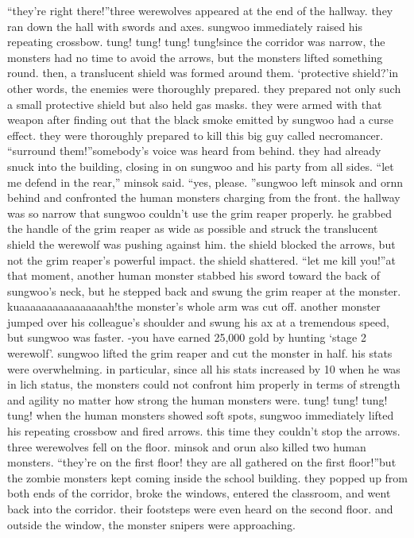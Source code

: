 “they’re right there!”three werewolves appeared at the end of the hallway.
 they ran down the hall with swords and axes.
 sungwoo immediately raised his repeating crossbow.
tung! tung! tung! tung!since the corridor was narrow, the monsters had no time to avoid the arrows, but the monsters lifted something round.
 then, a translucent shield was formed around them.
‘protective shield?’in other words, the enemies were thoroughly prepared.
 they prepared not only such a small protective shield but also held gas masks.
 they were armed with that weapon after finding out that the black smoke emitted by sungwoo had a curse effect.
they were thoroughly prepared to kill this big guy called necromancer.
“surround them!”somebody’s voice was heard from behind.
 they had already snuck into the building, closing in on sungwoo and his party from all sides.
“let me defend in the rear,” minsok said.
“yes, please.
”sungwoo left minsok and ornn behind and confronted the human monsters charging from the front.
the hallway was so narrow that sungwoo couldn’t use the grim reaper properly.
he grabbed the handle of the grim reaper as wide as possible and struck the translucent shield the werewolf was pushing against him.
the shield blocked the arrows, but not the grim reaper’s powerful impact.
 the shield shattered.
“let me kill you!”at that moment, another human monster stabbed his sword toward the back of sungwoo’s neck, but he stepped back and swung the grim reaper at the monster.
kuaaaaaaaaaaaaaaaah!the monster’s whole arm was cut off.
 another monster jumped over his colleague’s shoulder and swung his ax at a tremendous speed, but sungwoo was faster.
-you have earned 25,000 gold by hunting ‘stage 2 werewolf’.
sungwoo lifted the grim reaper and cut the monster in half.
 his stats were overwhelming.
 in particular, since all his stats increased by 10 when he was in lich status, the monsters could not confront him properly in terms of strength and agility no matter how strong the human monsters were.
tung! tung! tung! tung!
when the human monsters showed soft spots, sungwoo immediately lifted his repeating crossbow and fired arrows.
 this time they couldn’t stop the arrows.
 three werewolves fell on the floor.
minsok and orun also killed two human monsters.
“they’re on the first floor! they are all gathered on the first floor!”but the zombie monsters kept coming inside the school building.
 they popped up from both ends of the corridor, broke the windows, entered the classroom, and went back into the corridor.
 their footsteps were even heard on the second floor.
and outside the window, the monster snipers were approaching.
